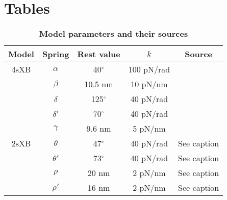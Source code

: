 \documentclass[10pt]{article}
\newcommand{\de}{$^\circ$} %
\newcommand{\citet}[1]{\cite{#1}} %
\begin{document}

\clearpage
\section*{Tables} %

\begin{table}[ht]
    \caption{\textbf{Model parameters and their sources}}
    \begin{center}
    \begin{tabular}[t]{|c|c|c|c|c|} \hline
    Model & Spring    & Rest value & $k$        & Source \\ \hline %
    4sXB  & $\alpha$  & 40\de      & 100 pN/rad & \citet{Liu2006}      \\ \hline
          & $\beta$   & 10.5 nm    & 10 pN/nm   & \citet{Liu2006}      \\ \hline
          & $\delta$  & 125\de     & 40 pN/rad  & \citet{Taylor1999}   \\ \hline
          & $\delta'$ & 70\de      & 40 pN/rad  & \citet{Taylor1999}   \\ \hline
          & $\gamma$  & 9.6 nm     & 5 pN/nm    & \citet{Houdusse2000} \\ \hline
    2sXB  & $\theta$  & 47\de      & 40 pN/rad  & See caption \\ \hline
          & $\theta'$ & 73\de      & 40 pN/rad  & See caption \\ \hline
          & $\rho$    & 20 nm      & 2 pN/nm    & See caption \\ \hline
          & $\rho'$   & 16 nm      & 2 pN/nm    & See caption \\ \hline

\end{tabular}
\end{center}
\end{table}
\end{document}
